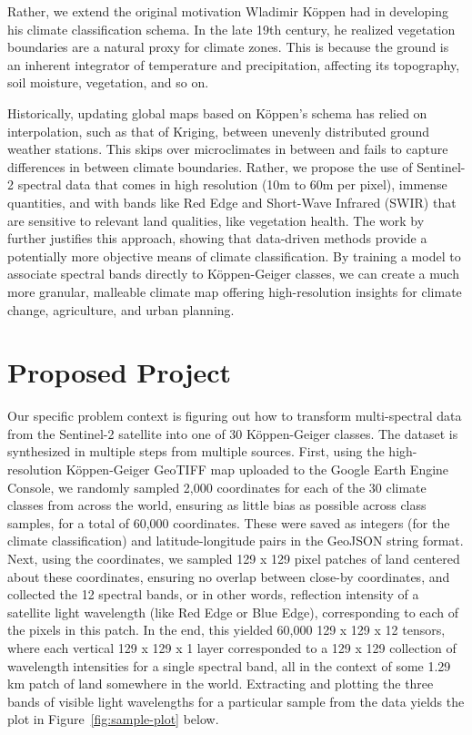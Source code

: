 \documentclass[12pt]{article}
\begin{document}
Rather, we extend the original motivation Wladimir Köppen had in developing his climate classification schema.
In the late 19th century, he realized vegetation boundaries are a natural proxy for climate zones.
This is because the ground is an inherent integrator of temperature and precipitation, affecting its topography, soil moisture, vegetation, and so on.

Historically, updating global maps based on Köppen's schema has relied on interpolation, such as that of Kriging, between unevenly distributed ground weather stations.
This skips over microclimates in between and fails to capture differences in between climate boundaries.
Rather, we propose the use of Sentinel-2 spectral data that comes in high resolution (10m to 60m per pixel), immense quantities, and with bands like Red Edge and Short-Wave Infrared (SWIR) that are sensitive to relevant land qualities, like vegetation health.
The work by \textcite{data-driven-kg} further justifies this approach, showing that data-driven methods provide a potentially more objective means of climate classification.
By training a model to associate spectral bands directly to Köppen-Geiger classes, we can create a much more granular, malleable climate map offering high-resolution insights for climate change, agriculture, and urban planning.

\section{Proposed Project}
\label{sec:proposed-project}

\indent Our specific problem context is figuring out how to transform multi-spectral data from the Sentinel-2  satellite into one of 30 Köppen-Geiger classes.
The dataset is synthesized in multiple steps from multiple sources.
First, using the high-resolution Köppen-Geiger GeoTIFF map uploaded to the Google Earth Engine Console, we randomly sampled 2,000 coordinates for each of the 30 climate classes from across the world, ensuring as little bias as possible across class samples, for a total of 60,000 coordinates.
These were saved as integers (for the climate classification) and latitude-longitude pairs in the GeoJSON string format.
Next, using the coordinates, we sampled 129 x 129 pixel patches of land centered about these coordinates, ensuring no overlap between close-by coordinates, and collected the 12 spectral bands, or in other words, reflection intensity of a satellite light wavelength (like Red Edge or Blue Edge), corresponding to each of the pixels in this patch.
In the end, this yielded 60,000 129 x 129 x 12 tensors, where each vertical 129 x 129 x 1 layer corresponded to a 129 x 129 collection of wavelength intensities for a single spectral band, all in the context of some 1.29 km patch of land somewhere in the world.
Extracting and plotting the three bands of visible light wavelengths for a particular sample from the data yields the plot in Figure~\ref{fig:sample-plot} below.
\end{document}
